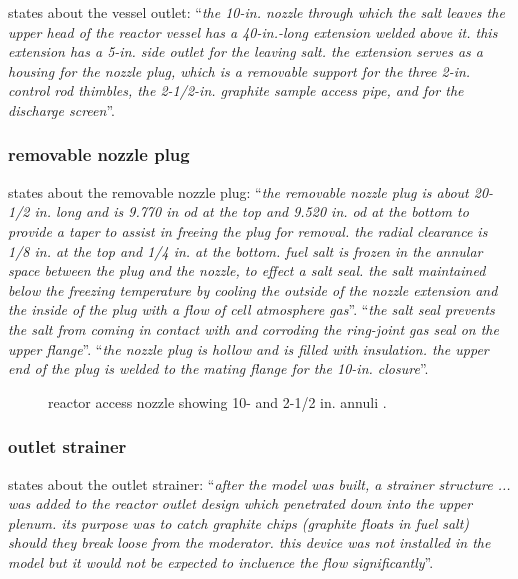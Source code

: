 \documentclass{article}
\newcommand*{\mrsarchive}{../../msr-archive}%
\begin{document}
\parencite[page 104]{ornl-tm-0728} states about the vessel outlet:
\enquote{\textit{the 10-in. nozzle through which the salt leaves the upper head of the reactor vessel has a 40-in.-long extension welded above it. this extension has a 5-in. side outlet for the leaving salt. the extension serves as a housing for the nozzle plug, which is a removable support for the three 2-in. control rod thimbles, the 2-1/2-in. graphite sample access pipe, and for the discharge screen}}.

\subsubsection{removable nozzle plug}
\parencite[page 104-105]{ornl-tm-0728} states about the removable nozzle plug:
\enquote{\textit{the removable nozzle plug is about 20-1/2 in. long and is 9.770 in od at the top and 9.520 in. od at the bottom to provide a taper to assist in freeing the plug for removal. the radial clearance is 1/8 in. at the top and 1/4 in. at the bottom. fuel salt is frozen in the annular space between the plug and the nozzle, to effect a salt seal. the salt maintained below the freezing temperature by cooling the outside of the nozzle extension and the inside of the plug with a flow of cell atmosphere gas}}.
\enquote{\textit{the salt seal prevents the salt from coming in contact with and corroding the ring-joint gas seal on the upper flange}}.
\enquote{\textit{the nozzle plug is hollow and is filled with insulation. the upper end of the plug is welded to the mating flange for the 10-in. closure}}.


\begin{figure}[H]
  \centering
  \centering
  \caption{reactor access nozzle showing 10- and 2-1/2 in. annuli  \parencite[figure 5.10]{ornl-tm-3229}.}
  \label{3039-fig5-10}
\end{figure}

\subsubsection{outlet strainer}
\textcite[page 24-26]{ornl-tm-3229} states about the outlet strainer:
\enquote{\textit{after the model was built, a strainer structure ... was added to the reactor outlet design which penetrated down into the upper plenum. its purpose was to catch graphite chips (graphite floats in fuel salt) should they break loose from the moderator. this device was not installed in the model but it would not be expected to incluence the flow significantly}}. \\
\end{document}

